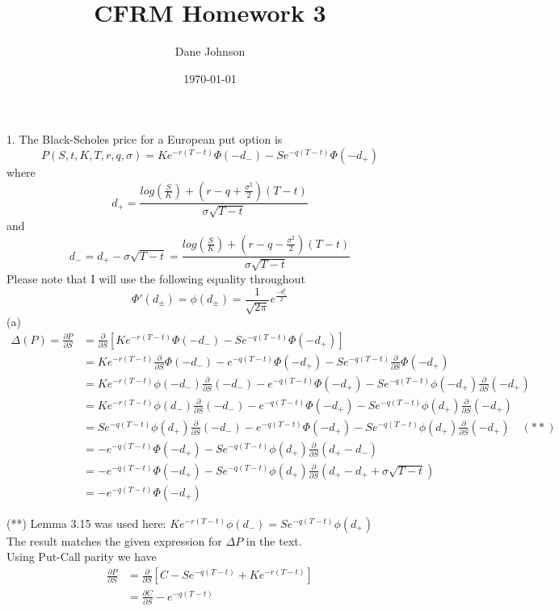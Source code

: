 \documentclass[11pt]{article}
\begin{document}
\title{CFRM Homework 3}
\author{Dane Johnson}
\date{\today}
\maketitle

1. The Black-Scholes price for a European put option is
$$P(S,t,K,T,r,q,\sigma) = Ke^{-r(T-t)}\Phi(-d_-)-Se^{-q(T-t)}\Phi(-d_+)$$
where
$$d_+ = \frac{log(\frac{S}{K}) + (r-q+\frac{\sigma^2}{2})(T-t)}{\sigma\sqrt{T-t}}$$
and
$$d_- = d_+ - \sigma\sqrt{T-t} = \frac{log(\frac{S}{K}) + (r-q-\frac{\sigma^2}{2})(T-t)}{\sigma\sqrt{T-t}}$$
Please note that I will use the following equality throughout
$$\Phi'(d_\pm) = \phi(d_\pm) = \frac{1}{\sqrt{2\pi}}e^{\frac{-d_\pm^2}{2}}$$
(a) \begin{align*}
\Delta (P) = \frac{\partial P}{\partial S} & = \frac{\partial}{\partial S} [Ke^{-r(T-t)}\Phi(-d_-)-Se^{-q(T-t)}\Phi(-d_+)] \\ & = Ke^{-r(T-t)}\frac{\partial}{\partial S} \Phi(-d_-) - e^{-q(T-t)}\Phi(-d_+) - Se^{-q(T-t)} \frac{\partial}{\partial S} \Phi(-d_+) \\ & = Ke^{-r(T-t)} \phi(-d_-) \frac{\partial}{\partial S} (-d_-) - e^{-q(T-t)}\Phi(-d_+) - Se^{-q(T-t)} \phi(-d_+) \frac{\partial}{\partial S} (-d_+) \\
& = Ke^{-r(T-t)} \phi(d_-) \frac{\partial}{\partial S} (-d_-) - e^{-q(T-t)}\Phi(-d_+) - Se^{-q(T-t)} \phi(d_+) \frac{\partial}{\partial S} (-d_+) \\
& = Se^{-q(T-t)}\phi(d_+) \frac{\partial}{\partial S} (-d_-)- e^{-q(T-t)}\Phi(-d_+) - Se^{-q(T-t)} \phi(d_+) \frac{\partial}{\partial S} (-d_+) \quad(**)\\
& = - e^{-q(T-t)}\Phi(-d_+) - Se^{-q(T-t)} \phi(d_+) \frac{\partial}{\partial S} (d_+ - d_-) \\
& = - e^{-q(T-t)}\Phi(-d_+) - Se^{-q(T-t)} \phi(d_+) \frac{\partial}{\partial S} (d_+ - d_+ + \sigma\sqrt{T-t}) \\
& = - e^{-q(T-t)}\Phi(-d_+)
\end{align*}

(**) Lemma 3.15 was used here: $Ke^{-r(T-t)} \phi(d_-) = Se^{-q(T-t)} \phi(d_+)$ \\


The result matches the given expression for $\Delta P$ in the text.\\

Using Put-Call parity we have
\begin{align*}
\frac{\partial P}{\partial S} & = \frac{\partial }{\partial S} \left[C - Se^{-q(T-t)} + Ke^{-r(T-t)} \right] \\
& = \frac{\partial C}{\partial S} - e^{-q(T-t)}
\end{align*}
\end{document}
